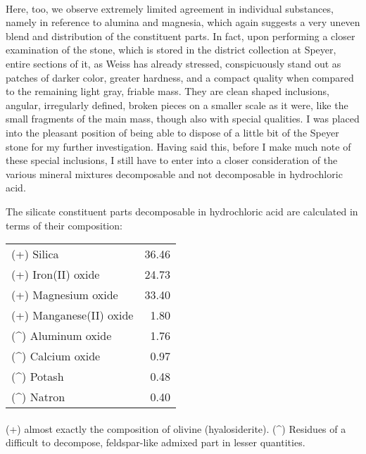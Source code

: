 \documentclass[a4paper, 12pt, oneside]{article}
\begin{document}
\paragraph*{}
Here, too, we observe extremely limited agreement in individual substances, namely in reference to alumina and magnesia, which again suggests a very uneven blend and distribution of the constituent parts. In fact, upon performing a closer examination of the stone, which is stored in the district collection at Speyer, entire sections of it, as Weiss has already stressed, conspicuously stand out as patches of darker color, greater hardness, and a compact quality when compared to the remaining light gray, friable mass. They are clean shaped inclusions, angular, irregularly defined, broken pieces on a smaller scale as it were, like the small fragments of the main mass, though also with special qualities. I was placed into the pleasant position of being able to dispose of a little bit of the Speyer stone for my further investigation. Having said this, before I make much note of these special inclusions, I still have to enter into a closer consideration of the various mineral mixtures decomposable and not decomposable in hydrochloric acid.

The silicate constituent parts decomposable in hydrochloric acid are calculated in terms of their composition:
\begin{center}
    \begin{tabular}{l r}
        (+) Silica & 36.46\\
        (+) Iron(II) oxide & 24.73\\
        (+) Magnesium oxide & 33.40\\
        (+) Manganese(II) oxide & 1.80\\
        (\^{}) Aluminum oxide & 1.76\\
        (\^{}) Calcium oxide & 0.97\\
        (\^{}) Potash & 0.48\\
        (\^{}) Natron & 0.40\\
    \end{tabular}
\end{center}
\paragraph*{}
(+) almost exactly the composition of olivine (hyalosiderite). (\^{}) Residues of a difficult to decompose, feldspar-like admixed part in lesser quantities.
\end{document}
